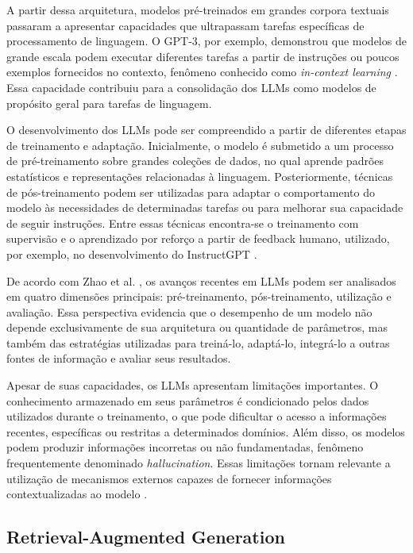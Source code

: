 A partir dessa arquitetura, modelos pré-treinados em grandes corpora textuais passaram a apresentar capacidades que ultrapassam tarefas específicas de processamento de linguagem. O GPT-3, por exemplo, demonstrou que modelos de grande escala podem executar diferentes tarefas a partir de instruções ou poucos exemplos fornecidos no contexto, fenômeno conhecido como \textit{in-context learning} \cite{brown2020language}. Essa capacidade contribuiu para a consolidação dos LLMs como modelos de propósito geral para tarefas de linguagem.

O desenvolvimento dos LLMs pode ser compreendido a partir de diferentes etapas de treinamento e adaptação. Inicialmente, o modelo é submetido a um processo de pré-treinamento sobre grandes coleções de dados, no qual aprende padrões estatísticos e representações relacionadas à linguagem. Posteriormente, técnicas de pós-treinamento podem ser utilizadas para adaptar o comportamento do modelo às necessidades de determinadas tarefas ou para melhorar sua capacidade de seguir instruções. Entre essas técnicas encontra-se o treinamento com supervisão e o aprendizado por reforço a partir de feedback humano, utilizado, por exemplo, no desenvolvimento do InstructGPT \cite{ouyang2022training}.

De acordo com Zhao et al. \cite{zhao2023survey}, os avanços recentes em LLMs podem ser analisados em quatro dimensões principais: pré-treinamento, pós-treinamento, utilização e avaliação. Essa perspectiva evidencia que o desempenho de um modelo não depende exclusivamente de sua arquitetura ou quantidade de parâmetros, mas também das estratégias utilizadas para treiná-lo, adaptá-lo, integrá-lo a outras fontes de informação e avaliar seus resultados.

Apesar de suas capacidades, os LLMs apresentam limitações importantes. O conhecimento armazenado em seus parâmetros é condicionado pelos dados utilizados durante o treinamento, o que pode dificultar o acesso a informações recentes, específicas ou restritas a determinados domínios. Além disso, os modelos podem produzir informações incorretas ou não fundamentadas, fenômeno frequentemente denominado \textit{hallucination}. Essas limitações tornam relevante a utilização de mecanismos externos capazes de fornecer informações contextualizadas ao modelo \cite{zhao2023survey}.

\subsection{Retrieval-Augmented Generation}
\label{subsec:rag}

